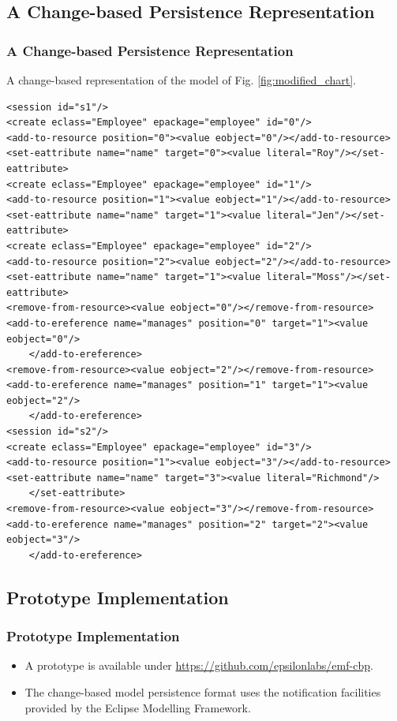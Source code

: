 \documentclass{beamer}
\begin{document}
\begin{frame}[fragile]
\section{A Change-based Persistence Representation}
\frametitle{A Change-based Persistence Representation}
A change-based representation of the model of Fig. \ref{fig:modified_chart}.
\begin{lstlisting}[style=xml,label=lst:cbpmodel]
<session id="s1"/>
<create eclass="Employee" epackage="employee" id="0"/>
<add-to-resource position="0"><value eobject="0"/></add-to-resource>
<set-eattribute name="name" target="0"><value literal="Roy"/></set-eattribute>
<create eclass="Employee" epackage="employee" id="1"/>
<add-to-resource position="1"><value eobject="1"/></add-to-resource>
<set-eattribute name="name" target="1"><value literal="Jen"/></set-eattribute>
<create eclass="Employee" epackage="employee" id="2"/>
<add-to-resource position="2"><value eobject="2"/></add-to-resource>
<set-eattribute name="name" target="1"><value literal="Moss"/></set-eattribute>
<remove-from-resource><value eobject="0"/></remove-from-resource>
<add-to-ereference name="manages" position="0" target="1"><value eobject="0"/>
    </add-to-ereference>
<remove-from-resource><value eobject="2"/></remove-from-resource>
<add-to-ereference name="manages" position="1" target="1"><value eobject="2"/>
    </add-to-ereference>
<session id="s2"/>
<create eclass="Employee" epackage="employee" id="3"/>
<add-to-resource position="1"><value eobject="3"/></add-to-resource>
<set-eattribute name="name" target="3"><value literal="Richmond"/>
    </set-eattribute>
<remove-from-resource><value eobject="3"/></remove-from-resource>
<add-to-ereference name="manages" position="2" target="2"><value eobject="3"/>
    </add-to-ereference>
\end{lstlisting}
\end{frame}

\begin{frame}
\section{Prototype Implementation}
\frametitle{Prototype Implementation}
\begin{itemize}
\item A prototype is available under \url{https://github.com/epsilonlabs/emf-cbp}.
\item The change-based model persistence format uses the notification facilities provided by the Eclipse Modelling Framework. 
\end{itemize}
\end{frame}
\end{document}
